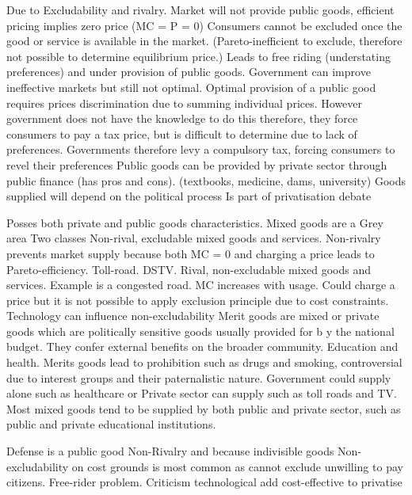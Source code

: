 \documentclass[12pt]{examnotes}
\begin{document}
\ra Due to Excludability and rivalry.
\ra Market will not provide public goods, efficient pricing implies zero price (MC = P = 0)
\ra Consumers cannot be excluded once the good or service is available in the market. (Pareto-inefficient to exclude, therefore not possible to determine equilibrium price.)
\ra Leads to free riding (understating preferences) and under provision of public goods. 
\ra Government can improve ineffective markets but still not optimal. 
\ra Optimal provision of a public good requires prices discrimination due to summing individual prices. However government does not have the knowledge to do this therefore, they force consumers to pay a tax price, but is difficult to determine due to lack of preferences.
\ra Governments therefore levy a compulsory tax, forcing consumers to revel their preferences
\ra Public goods can be provided by private sector through public finance (has pros and cons). (textbooks, medicine, dams, university)
\ra Goods supplied will depend on the political process
\ra Is part of privatisation debate

\ra Posses both private and public goods characteristics.
\ra Mixed goods are a Grey area
\ra Two classes
 Non-rival, excludable mixed goods and services. Non-rivalry prevents market supply because both MC = 0 and charging a price leads to Pareto-efficiency. Toll-road. DSTV.
 Rival, non-excludable mixed goods and services. Example is a congested road. MC increases with usage. Could charge a price but it is not possible to apply exclusion principle due to cost constraints. 
\ra Technology can influence non-excludability
\ra Merit goods are mixed or private goods which are politically sensitive goods usually provided for b y the national budget. They confer external benefits on the broader community. Education and health.
\ra Merits goods lead to prohibition such as drugs and smoking, controversial due to interest groups and their paternalistic nature.
\ra Government could supply alone such as healthcare or Private sector can supply such as toll roads and TV. 
\ra Most mixed goods tend to be supplied by both public and private sector, such as public and private educational institutions.

\ra Defense is a public good
\ra Non-Rivalry and because indivisible goods 
\ra Non-excludability on cost grounds is most common as cannot exclude unwilling to pay citizens. Free-rider problem.
\ra Criticism technological add cost-effective to privatise
\end{document}
